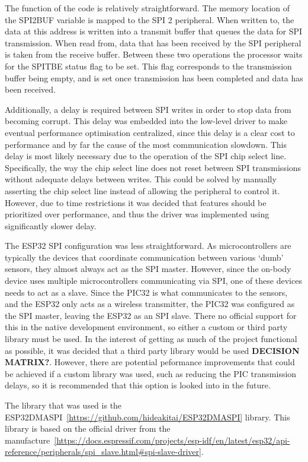 The function of the code is relatively straightforward.
The memory location of the SPI2BUF variable is mapped to the SPI 2 peripheral.
When written to, the data at this address is written into a transmit buffer that queues the data for SPI transmission.
When read from, data that has been received by the SPI peripheral is taken from the receive buffer.
Between these two operations the processor waits for the SPITBE status flag to be set.
This flag corresponds to the transmission buffer being empty, and is set once transmission has been completed and data has been received.

Additionally, a delay is required between SPI writes in order to stop data from becoming corrupt.
This delay was embedded into the low-level driver to make eventual performance optimisation centralized,
since this delay is a clear cost to performance and by far the cause of the most communication slowdown.
This delay is most likely necessary due to the operation of the SPI chip select line.
Specifically, the way the chip select line does not reset between SPI transmissions without adequate delays between writes.
This could be solved by manually asserting the chip select line instead of allowing the peripheral to control it.
However, due to time restrictions it was decided that features should be prioritized over performance,
and thus the driver was implemented using significantly slower delay.

The ESP32 SPI configuration was less straightforward.
As microcontrollers are typically the devices that coordinate communication between various `dumb' sensors,
they almost always act as the SPI master.
However, since the on-body device uses multiple microcontrollers communicating via SPI,
one of these devices needs to act as a slave.
Since the PIC32 is what communicates to the sensors, and the ESP32 only acts as a wireless transmitter,
the PIC32 was configured as the SPI master, leaving the ESP32 as an SPI slave.
There no official support for this in the native development environment, so either a custom or third party library must be used.
In the interest of getting as much of the project functional as possible, it was decided that a third party library would be used \textbf{DECISION MATRIX?}.
However, there are potential peformance improvements that could be achieved if a custom library was used, such as reducing the PIC transmission delays,
so it is recommended that this option is looked into in the future.

The library that was used is the ESP32DMASPI~\ref{https://github.com/hideakitai/ESP32DMASPI} library.
This library is based on the official driver from the manufacture~\ref{https://docs.espressif.com/projects/esp-idf/en/latest/esp32/api-reference/peripherals/spi_slave.html#spi-slave-driver}.

